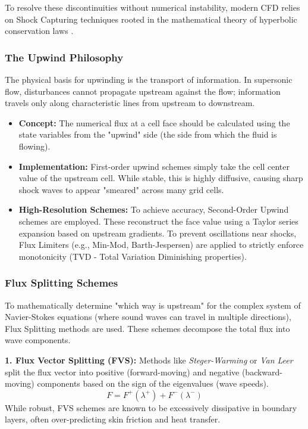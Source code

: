 To resolve these discontinuities without numerical instability, modern CFD relies on Shock Capturing techniques rooted in the mathematical theory of hyperbolic conservation laws \cite{versteeg2007cfd}.



\subsubsection{The Upwind Philosophy}
The physical basis for upwinding is the transport of information. In supersonic flow, disturbances cannot propagate upstream against the flow; information travels only along characteristic lines from upstream to downstream.
\begin{itemize}
    \item \textbf{Concept:} The numerical flux at a cell face should be calculated using the state variables from the "upwind" side (the side from which the fluid is flowing).
    \item \textbf{Implementation:} First-order upwind schemes simply take the cell center value of the upstream cell. While stable, this is highly diffusive, causing sharp shock waves to appear "smeared" across many grid cells.
    \item \textbf{High-Resolution Schemes:} To achieve accuracy, Second-Order Upwind schemes are employed. These reconstruct the face value using a Taylor series expansion based on upstream gradients. To prevent oscillations near shocks, Flux Limiters (e.g., Min-Mod, Barth-Jespersen) are applied to strictly enforce monotonicity (TVD - Total Variation Diminishing properties).
\end{itemize}

\subsubsection{Flux Splitting Schemes}
To mathematically determine "which way is upstream" for the complex system of Navier-Stokes equations (where sound waves can travel in multiple directions), Flux Splitting methods are used. These schemes decompose the total flux into wave components.

\textbf{1. Flux Vector Splitting (FVS):}
Methods like \textit{Steger-Warming} or \textit{Van Leer} split the flux vector into positive (forward-moving) and negative (backward-moving) components based on the sign of the eigenvalues (wave speeds).
\begin{equation}
    F = F^+(\lambda^+) + F^-(\lambda^-)
\end{equation}
While robust, FVS schemes are known to be excessively dissipative in boundary layers, often over-predicting skin friction and heat transfer.

